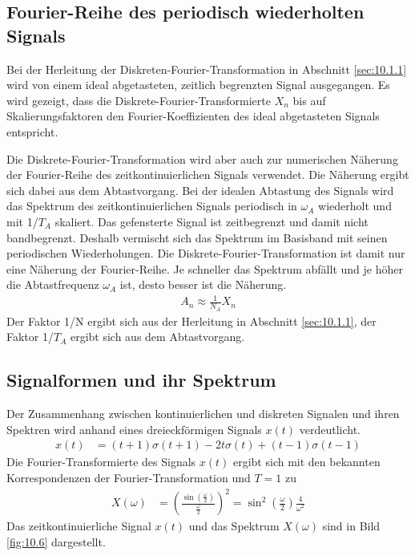 \subsection{Fourier-Reihe des periodisch wiederholten Signals}\label{sec:fourier-reihe-des-periodisch-wiederholten-signals}

Bei der Herleitung der Diskreten-Fourier-Transformation in Abschnitt \ref{sec:10.1.1} wird von einem ideal abgetasteten, zeitlich begrenzten Signal ausgegangen. Es wird gezeigt, dass die Diskrete-Fourier-Transformierte \(X_{n}\) bis auf Skalierungsfaktoren den Fourier-Koeffizienten des ideal abgetasteten Signals entspricht.

Die Diskrete-Fourier-Transformation wird aber auch zur numerischen Näherung der Fourier-Reihe des zeitkontinuierlichen Signals verwendet. Die Näherung ergibt sich dabei aus dem Abtastvorgang. Bei der idealen Abtastung des Signals wird das Spektrum des zeitkontinuierlichen Signals periodisch in \(ω_{A}\) wiederholt und mit 1/\(T_{A}\) skaliert. Das gefensterte Signal ist zeitbegrenzt und damit nicht bandbegrenzt. Deshalb vermischt sich das Spektrum im Basisband mit seinen periodischen Wiederholungen. Die Diskrete-Fourier-Transformation ist damit nur eine Näherung der Fourier-Reihe. Je schneller das Spektrum abfällt und je höher die Abtastfrequenz \(ω_{A}\) ist, desto besser ist die Näherung.
\begin{align}
A_{n} \approx \frac{1}{N_{A}}  X_{n} \label{eq:10.28}
\end{align}
Der Faktor 1/N ergibt sich aus der Herleitung in Abschnitt \ref{sec:10.1.1}, der Faktor 1/\(T_{A}\) ergibt sich aus dem Abtastvorgang.

\subsection{Signalformen und ihr Spektrum}\label{sec:signalformen-und-ihr-spektrum}

Der Zusammenhang zwischen kontinuierlichen und diskreten Signalen und ihren Spektren wird anhand eines dreieckförmigen Signals \(x(t)\) verdeutlicht.
\begin{align}
x(t) &= (t + 1)  \sigma(t + 1) - 2  t  \sigma(t) + (t - 1)  \sigma(t - 1) \label{eq:10.29}
\end{align}
Die Fourier-Transformierte des Signals \(x(t)\) ergibt sich mit den bekannten Korrespondenzen der Fourier-Transformation und \(T = 1\) zu
\begin{align}
X(\omega) &= \left( \frac{\sin\left( \frac{\omega}{2} \right)}{\frac{\omega}{2}} \right)^{2} = \sin^{2}\left( \frac{\omega}{2} \right)  \frac{4}{\omega^{2}} \label{eq:10.30}
\end{align}
Das zeitkontinuierliche Signal \(x(t)\) und das Spektrum \(X(ω)\) sind in Bild \ref{fig:10.6} dargestellt.

